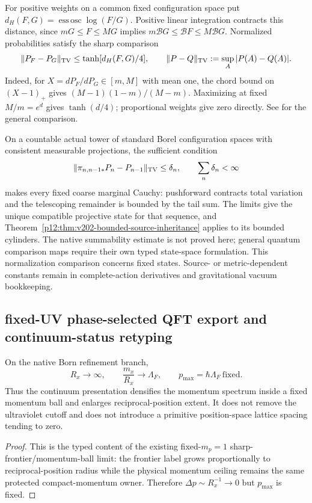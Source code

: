\documentclass[12pt,a4paper]{article}
\begin{document}
For positive weights on a common fixed configuration space put
$d_H(F,G)=\operatorname{ess\,osc}\log(F/G)$. Positive linear integration
contracts this distance, since $mG\le F\le MG$ implies
$m\mathcal BG\le\mathcal BF\le M\mathcal BG$.
Normalized probabilities satisfy the sharp comparison
\[
 \|P_F-P_G\|_{\rm TV}\le\tanh[d_H(F,G)/4],
 \qquad \|P-Q\|_{\rm TV}:=\sup_A|P(A)-Q(A)|.
\]
Indeed, for $X=dP_F/dP_G\in[m,M]$ with mean one, the chord bound on
$(X-1)_+$ gives $(M-1)(1-m)/(M-m)$. Maximizing at fixed $M/m=e^d$
gives $\tanh(d/4)$; proportional weights give zero directly. See
\cite{CohenFaustiHilbert2024} for the general comparison.

On a countable actual tower of standard Borel configuration spaces with
consistent measurable projections, the sufficient condition
\[
 \|\pi_{n,n-1*}P_n-P_{n-1}\|_{\rm TV}\le\delta_n,
 \qquad \sum_n\delta_n<\infty
\]
makes every fixed coarse marginal Cauchy: pushforward contracts total
variation and the telescoping remainder is bounded by the tail sum.
The limits give the unique compatible projective state for that
sequence, and Theorem~\ref{p12:thm:v202-bounded-source-inheritance}
applies to its bounded cylinders. The native summability estimate is not
proved here; general quantum comparison maps require their own typed
state-space formulation. This normalization comparison concerns fixed
states. Source- or metric-dependent constants remain in complete-action
derivatives and gravitational vacuum bookkeeping.

\begingroup
\small
\RaggedRight
\setlength{\emergencystretch}{3em}




\subsection{fixed-UV phase-selected QFT export and continuum-status retyping}
\label{p12:sec:v283-phase-selected-fixed-uv-export}

\begin{theorem}
\label{p12:thm:v283-fixed-uv-born-continuum}
On the native Born refinement branch,
\[
 R_x\to\infty,\qquad \frac{m_x}{R_x}\to\Lambda_F,
 \qquad p_{\max}=\hbar\Lambda_F\ \text{fixed}.
\]
Thus the continuum presentation densifies the momentum spectrum inside a fixed momentum ball and enlarges reciprocal-position extent.  It does not remove the ultraviolet cutoff and does not introduce a primitive position-space lattice spacing tending to zero.
\end{theorem}
\begin{proof}
This is the typed content of the existing fixed-\(m_p=1\) sharp-frontier/momentum-ball limit: the frontier label grows proportionally to reciprocal-position radius while the physical momentum ceiling remains the same protected compact-momentum owner.  Therefore \(\Delta p\sim R_x^{-1}\to0\) but \(p_{\max}\) is fixed.
\end{proof}
\end{document}
